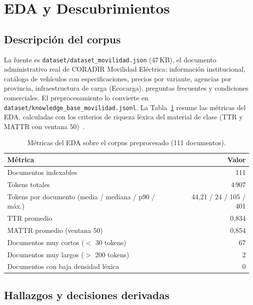 \documentclass[11pt,a4paper]{article}
\newcommand{\code}[1]{\texttt{#1}}
\begin{document}
\section{EDA y Descubrimientos}\label{sec:eda}

\subsection{Descripción del corpus}

La fuente es \code{dataset/dataset\_movilidad.json} (47\,KB), el documento
administrativo real de CORADIR Movilidad Eléctrica: información
institucional, catálogo de vehículos con especificaciones, precios por
variante, agencias por provincia, infraestructura de carga (Ecocarga),
preguntas frecuentes y condiciones comerciales. El preprocesamiento lo
convierte en \code{dataset/knowledge\_base\_movilidad.jsonl}. La
Tabla~\ref{tab:corpus} resume las métricas del EDA, calculadas con los
criterios de riqueza léxica del material de clase (TTR y MATTR con ventana
50)~\cite{covington}.

\begin{table}[H]
\centering
\begin{tabular}{lr}
\toprule
\textbf{Métrica} & \textbf{Valor} \\
\midrule
Documentos indexables & 111 \\
Tokens totales & 4\,907 \\
Tokens por documento (media / mediana / p90 / máx.) & 44{,}21 / 24 / 105 / 401 \\
TTR promedio & 0{,}834 \\
MATTR promedio (ventana 50) & 0{,}854 \\
Documentos muy cortos ($<$ 30 tokens) & 67 \\
Documentos muy largos ($>$ 200 tokens) & 2 \\
Documentos con baja densidad léxica & 0 \\
\bottomrule
\end{tabular}
\caption{Métricas del EDA sobre el corpus preprocesado (111 documentos).}
\label{tab:corpus}
\end{table}

\subsection{Hallazgos y decisiones derivadas}
\end{document}
